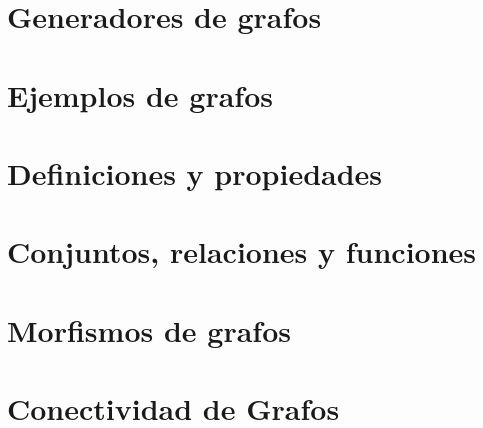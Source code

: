 
\section{Generadores de grafos}


\section{Ejemplos de grafos}


\section{Definiciones y propiedades}


\section{Conjuntos, relaciones y funciones}


\section{Morfismos de grafos}


\section{Conectividad de Grafos}


